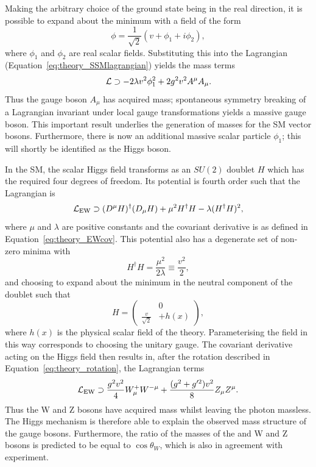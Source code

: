 Making the arbitrary choice of the ground state being in the real direction, 
it is possible to expand about the minimum with a field of the form
\begin{equation}
\phi = \frac{1}{\sqrt{2}} (v + \phi_1 + i\phi_2) ,
\end{equation}
where $\phi_1$ and $\phi_2$ are real scalar fields.
Substituting this into the Lagrangian (Equation~\ref{eq:theory_SSMlagrangian}) yields the mass terms
\begin{equation}
\mathcal{L} \supset - 2 \lambda v^2 \phi^2_1 + 2 g^2 v^2 A^\mu A_\mu .
\end{equation}
Thus the gauge boson $A_\mu$ has acquired mass;
spontaneous symmetry breaking of a Lagrangian invariant under local gauge transformations 
yields a massive gauge boson. 
This important result underlies the generation of masses for the SM vector bosons.
Furthermore, there is now an additional massive scalar particle $\phi_1$;
this will shortly be identified as the Higgs boson.

In the SM, the scalar Higgs field transforms as an $SU(2)$ doublet $H$ 
which has the required four degrees of freedom. 
Its potential is fourth order such that the Lagrangian is
\begin{equation}
\mathcal{L}_{\textrm{EW}} \supset (D^\mu H)^\dagger (D_\mu H) + \mu^2 H^\dagger H - \lambda (H^\dagger H)^2 ,
\end{equation}
where $\mu$ and $\lambda$ are positive constants 
and the covariant derivative is as defined in Equation~\ref{eq:theory_EWcov}.
This potential also has a degenerate set of non-zero minima with 
\begin{equation}
H^\dagger H = \frac{\mu^2}{2\lambda} \equiv \frac{v^2}{2} , 
\end{equation}
and choosing to expand about the minimum in the neutral component of the doublet such that 
\begin{equation}
H = \left(
\begin{split}
&0 \\
\frac{v}{\sqrt{2}} &+ h(x)
\end{split}
\right) ,
\end{equation}
where $h(x)$ is the physical scalar field of the theory.
Parameterising the field in this way corresponds to choosing the unitary gauge.
The covariant derivative acting on the Higgs field then results in, 
after the rotation described in Equation~\ref{eq:theory_rotation}, the Lagrangian terms
\begin{equation}
\mathcal{L}_{\textrm{EW}} \supset \frac{g^2v^2}{4} W^+_\mu W^{-\mu} 
                         + \frac{(g^2 + g^{\prime 2})v^2}{8} Z_\mu Z^\mu .
\end{equation}
Thus the W and Z bosons have acquired mass whilst leaving the photon massless.
The Higgs mechanism is therefore able to explain the observed mass structure 
of the gauge bosons.
Furthermore, the ratio of the masses of the and W and Z bosons 
is predicted to be equal to $\cos{\theta_W}$, which is also in agreement with experiment.

